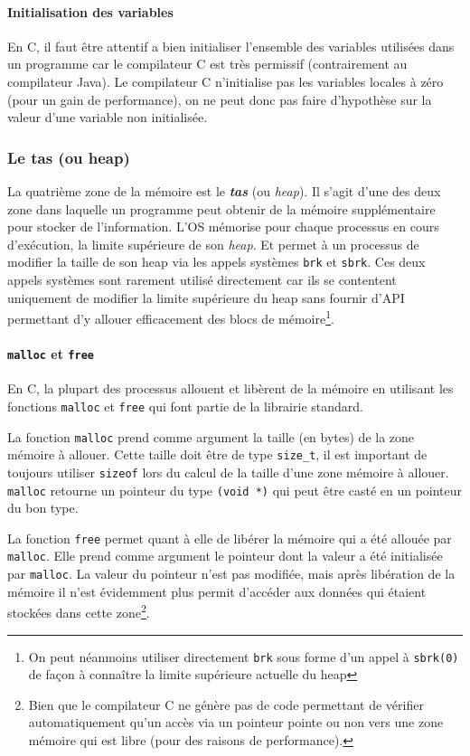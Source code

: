 \paragraph{Initialisation des variables} En C, il faut être attentif a bien initialiser l'ensemble des variables utilisées dans un programme car le compilateur C est très permissif (contrairement au compilateur Java).
Le compilateur C n'initialise pas les variables locales à zéro (pour un gain de performance), on ne peut donc pas faire d'hypothèse sur la valeur d'une variable non initialisée.

\subsubsection{Le tas (ou heap)}
La quatrième zone de la mémoire est le \textbf{\textit{tas}} (ou \textit{heap}).
Il s'agit d'une des deux zone dans laquelle un programme peut obtenir de la mémoire supplémentaire pour stocker de l'information.
L'OS mémorise pour chaque processus en cours d'exécution, la limite supérieure de son \textit{heap}.
Et permet à un processus de modifier la taille de son heap via les appels systèmes \texttt{brk} et \texttt{sbrk}.
Ces deux appels systèmes sont rarement utilisé directement car ils se contentent uniquement de modifier la limite supérieure du heap sans fournir d'API permettant d'y allouer efficacement des blocs de mémoire\footnote{On peut néanmoins utiliser directement \texttt{brk} sous forme d'un appel à \texttt{sbrk(0)} de façon à connaître la limite supérieure actuelle du heap}.

\paragraph{\texttt{malloc} et \texttt{free}}

En C, la plupart des processus allouent et libèrent de la mémoire en utilisant les fonctions \texttt{malloc} et \texttt{free} qui font partie de la librairie standard.

La fonction \texttt{malloc} prend comme argument la taille (en bytes) de la zone mémoire à allouer.
Cette taille doit être de type \texttt{size\_t}, il est important de toujours utiliser \texttt{sizeof} lors du calcul de la taille d'une zone mémoire à allouer.
\texttt{malloc} retourne un pointeur du type \texttt{(void *)} qui peut être casté en un pointeur du bon type.

La fonction \texttt{free} permet quant à elle de libérer la mémoire qui a été allouée par \texttt{malloc}.
Elle prend comme argument le pointeur dont la valeur a été initialisée par \texttt{malloc}.
La valeur du pointeur n'est pas modifiée, mais après libération de la mémoire il n'est évidemment plus permit d'accéder aux données qui étaient stockées dans cette zone\footnote{Bien que le compilateur C ne génère pas de code permettant de vérifier automatiquement qu'un accès via un pointeur pointe ou non vers une zone mémoire qui est libre (pour des raisons de performance).}.

